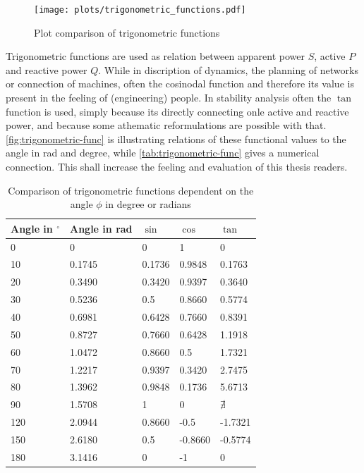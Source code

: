 \begin{figure}[H]
    \centering
    \texttt{[image: plots/trigonometric\_functions.pdf]}
    \caption[Plot comparison of trigonometric functions]{Plot comparison of trigonometric functions}
    \label{fig:trigonometric-func}
\end{figure}

Trigonometric functions are used as relation between apparent power $S$, active $P$ and reactive power $Q$.
While in discription of dynamics, the planning of networks or connection of machines, often the cosinodal function and therefore its value is present in the feeling of (engineering) people.
In stability analysis often the $\tan$ function is used, simply because its directly connecting onle active and reactive power, and because some athematic reformulations are possible with that. 
\autoref{fig:trigonometric-func} is illustrating relations of these functional values to the angle in rad and degree, while \autoref{tab:trigonometric-func} gives a numerical connection.
This shall increase the feeling and evaluation of this thesis readers.

\begin{table}[H]
    \centering
    \small
    \caption{Comparison of trigonometric functions dependent on the angle $\phi$ in degree or radians}
    \label{tab:trigonometric-func}
    \vspace*{12pt}
    \begin{tabularx}{\linewidth}{XXXXX}
        \textbf{Angle in $^\circ$} & \textbf{Angle in rad} & \textbf{$\sin$} & \textbf{$\cos$} & \textbf{$\tan$} \\ \toprule
        0   & 0         & 0         & 1         & 0 \\
        10  & 0.1745    & 0.1736    & 0.9848    & 0.1763 \\
        20  & 0.3490    & 0.3420    & 0.9397    & 0.3640 \\
        30  & 0.5236    & 0.5       & 0.8660    & 0.5774 \\
        40  & 0.6981    & 0.6428    & 0.7660    & 0.8391 \\
        50  & 0.8727    & 0.7660    & 0.6428    & 1.1918 \\ 
        60  & 1.0472    & 0.8660    & 0.5       & 1.7321 \\
        70  & 1.2217    & 0.9397    & 0.3420    & 2.7475 \\
        80  & 1.3962    & 0.9848    & 0.1736    & 5.6713 \\
        90  & 1.5708    & 1         & 0         & $\nexists$ \\
        120 & 2.0944    & 0.8660    & -0.5      & -1.7321 \\
        150 & 2.6180    & 0.5       & -0.8660   & -0.5774 \\
        180 & 3.1416    & 0         & -1        & 0 \\
        \bottomrule
    \end{tabularx}
\end{table}

